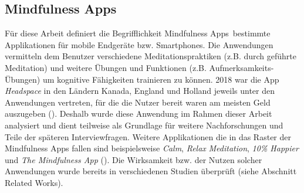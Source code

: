 \documentclass[10pt]{article}
\newcommand{\zit}[1]{(\cite{#1})}
\begin{document}
\subsection{Mindfulness Apps}
Für diese Arbeit definiert die Begrifflichkeit  \grqq Mindfulness Apps\grqq\ bestimmte Applikationen für mobile Endgeräte bzw. Smartphones. Die Anwendungen vermitteln dem Benutzer verschiedene Meditationspraktiken (z.B. durch geführte Meditation) und weitere Übungen und Funktionen (z.B. Aufmerksamkeits-Übungen) um kognitive Fähigkeiten trainieren zu können. 2018 war die App \textit{Headspace} in den Ländern Kanada, England und Holland jeweils unter den Anwendungen vertreten, für die die Nutzer bereit waren am meisten Geld auszugeben \zit{SteigendeNutzung}. Deshalb wurde diese Anwendung im Rahmen dieser Arbeit analysiert und dient teilweise als Grundlage für weitere Nachforschungen und Teile der späteren Interviewfragen. 
Weitere Applikationen die in das Raster der Mindfulness Apps fallen sind beispielsweise \textit{Calm}, \textit{Relax} \textit{Meditation}, \textit{10\% Happier} und\textit{ The Mindfulness App }\zit{VergleichApps}. Die Wirksamkeit bzw. der Nutzen solcher Anwendungen wurde bereits in verschiedenen Studien überprüft (siehe Abschnitt Related Works).
\end{document}
